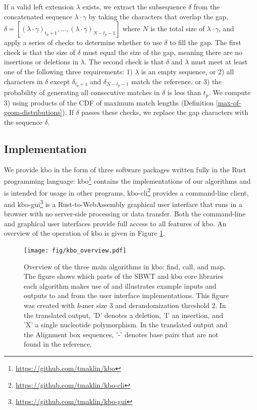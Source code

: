 \documentclass[unnumsec,webpdf,modern,large]{biorxiv}%
\theoremstyle{thmstyleone}%
\theoremstyle{thmstyletwo}%
\theoremstyle{thmstylethree}%
\begin{document}
If a valid left extension $\lambda$ exists, we extract the subsequence $\delta$ from the concatenated sequence $\lambda \cdot \gamma$ by taking the characters that overlap the gap, $\delta = \left[\left(\lambda \cdot \gamma\right)_{t_p + 1},\dots,\left(\lambda \cdot \gamma\right)_{N - t_p - 1}\right]$ where $N$ is the total size of $\lambda \cdot \gamma$, and apply a series of checks to determine whether to use $\delta$ to fill the gap. The first check is that the size of $\delta$ must equal the size of the gap, meaning there are no insertions or deletions in $\lambda$. The second check is that $\delta$ and $\lambda$ must meet at least one of the following three requirements: 1) $\lambda$ is an empty sequence, or 2) all characters in $\delta$ except $\delta_{t_p + 1}$ and $\delta_{ N - t_p - 1}$ match the reference, or 3) the probability of generating all consecutive matches in $\delta$ is less than $t_p$. We compute 3) using products of the CDF of maximum match lengths (Definition \ref{max-of-geom-distributions}). If $\delta$ passes these checks, we replace the gap characters with the sequence $\delta$.

\subsection{Implementation}
We provide {\sf kbo} in the form of three software packages written fully in the Rust programming language: kbo\footnote{\url{https://github.com/tmaklin/kbo}} contains the implementations of our algorithms and is intended for usage in other programs, kbo-cli\footnote{\url{https://github.com/tmaklin/kbo-cli}} provides a command-line client, and kbo-gui\footnote{\url{https://github.com/tmaklin/kbo-gui}} is a Rust-to-WebAssembly graphical user interface that runs in a browser with no server-side processing or data transfer. Both the command-line and graphical user interfaces provide full access to all features of {\sf kbo}. An overview of the operation of {\sf kbo} is given in Figure \ref{fig:kbo-overview}.

\begin{figure}[!t]%
\centering
\texttt{[image: fig/kbo\_overview.pdf]}
\caption{Overview of the three main algorithms in {\sf kbo}: find, call, and map. The figure shows which parts of the SBWT and {\sf kbo} core libraries each algorithm makes use of and illustrates example inputs and outputs to and from the user interface implementations. This figure was created with \emph{k}-mer size $3$ and derandomization threshold $2$. In the translated output, 'D' denotes a deletion, 'I' an insertion, and 'X' a single nucleotide polymorphism. In the translated output and the Alignment box sequences, '-' denotes base pairs that are not found in the reference.}\label{fig:kbo-overview}
\end{figure}
\end{document}
